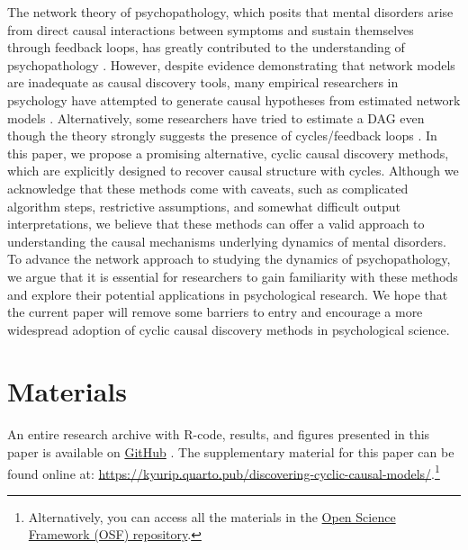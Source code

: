 \documentclass[twoside, 11pt]{article}
\begin{document}
The network theory of psychopathology, which posits that mental disorders arise from direct causal interactions between symptoms and sustain themselves through feedback loops, has greatly contributed to the understanding of psychopathology \citep{borsboom_network_2017}. However, despite evidence demonstrating that network models are inadequate as causal discovery tools, many empirical researchers in psychology have attempted to generate causal hypotheses from estimated network models \citep{Ryan2022}. Alternatively, some researchers have tried to estimate a DAG even though the theory strongly suggests the presence of cycles/feedback loops \citep{mcnally_co-morbid_2017, briganti_tutorial_2022}. In this paper, we propose a promising alternative, cyclic causal discovery methods, which are explicitly designed to recover causal structure with cycles. Although we acknowledge that these methods come with caveats, such as complicated algorithm steps, restrictive assumptions, and somewhat difficult output interpretations, we believe that these methods can offer a valid approach to understanding the causal mechanisms underlying dynamics of mental disorders. To advance the network approach to studying the dynamics of psychopathology, we argue that it is essential for researchers to gain familiarity with these methods and explore their potential applications in psychological research. We hope that the current paper will remove some barriers to entry and encourage a more widespread adoption of cyclic causal discovery methods in psychological science.



\section*{Materials}  %
An entire research archive with R-code, results, and figures presented in this paper is available on \href{https://github.com/KyuriP/Thesis_KP}{GitHub} \citep{Park_Discovering_cyclic_causal_2023}. The supplementary material for this paper can be found online at: \url{https://kyurip.quarto.pub/discovering-cyclic-causal-models/}.\footnote{Alternatively, you can access all the materials in the \href{https://osf.io/tjbq2/}{Open Science Framework (OSF) repository}.}
\end{document}
